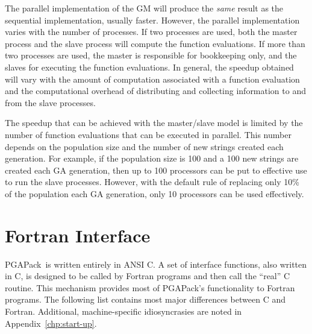 \documentclass{report}
\newcommand{\pga}{PGAPack}
\begin{document}
The parallel implementation of the GM will produce the {\em same} result as
the sequential implementation, usually faster.  However, the parallel
implementation varies with the number of processes.  If two processes are
used, both the master process and the slave process will compute the function
evaluations.  If more than two processes are used, the master is responsible
for bookkeeping only, and the slaves for executing the function evaluations.
In general, the speedup obtained will vary with the amount of computation
associated with a function evaluation and the computational overhead of
distributing and collecting information to and from the slave processes.

The speedup that can be achieved with the master/slave model is limited by the
number of function evaluations that can be executed in parallel.  This number
depends on the population size and the number of new strings created each
generation.  For example, if the population size is 100 and a 100 new strings
are created each GA generation, then up to 100 processors can be put to
effective use to run the slave processes.  However, with the default rule of
replacing only 10\% of the population each GA generation, only 10 processors
can be used effectively.



\chapter{Fortran Interface}\label{chp:fortran}

\pga\ is written entirely in ANSI C.  A set of interface functions, also
written in C, is designed to be called by Fortran programs and then call the
``real'' C routine.  This mechanism provides  most of
\pga's functionality to Fortran programs.  The following list contains most
major differences between C and Fortran.  Additional, machine-specific
idiosyncrasies are noted in Appendix~\ref{chp:start-up}.
\end{document}
